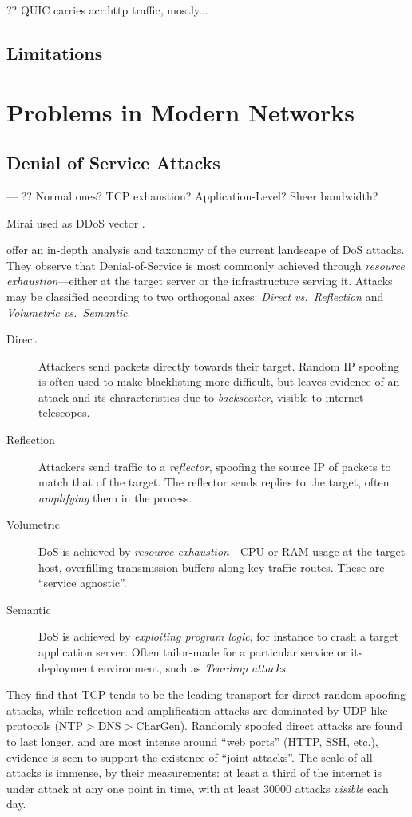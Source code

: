 ?? QUIC carries \gls{acr:http} traffic, mostly...

\subsection{Limitations}

\section{Problems in Modern Networks}\label{sec:problems-in-modern-networks}

\subsection{Denial of Service Attacks}
---
?? Normal ones? TCP exhaustion? Application-Level? Sheer bandwidth?

Mirai used as DDoS vector \cite{DBLP:conf/uss/AntonakakisABBB17}.

\Textcite{DBLP:conf/imc/JonkerKKRSD17} offer an in-depth analysis and taxonomy of the current landscape of DoS attacks.
They observe that Denial-of-Service is most commonly achieved through \emph{resource exhaustion}---either at the target server or the infrastructure serving it.
Attacks may be classified according to two orthogonal axes: \emph{Direct vs.\ Reflection} and \emph{Volumetric vs.\ Semantic}.
\begin{description}
	\item[Direct] Attackers send packets directly towards their target. Random IP spoofing is often used to make blacklisting more difficult, but leaves evidence of an attack and its characteristics due to \emph{backscatter}, visible to internet telescopes.
	\item[Reflection] Attackers send traffic to a \emph{reflector}, spoofing the source IP of packets to match that of the target. The reflector sends replies to the target, often \emph{amplifying} them in the process.
	\item[Volumetric] DoS is achieved by \emph{resource exhaustion}---CPU or RAM usage at the target host, overfilling transmission buffers along key traffic routes. These are ``service agnostic''.
	\item[Semantic] DoS is achieved by \emph{exploiting program logic}, for instance to crash a target application server. Often tailor-made for a particular service or its deployment environment, such as \emph{Teardrop attacks}.
\end{description}
They find that TCP tends to be the leading transport for direct random-spoofing attacks, while reflection and amplification attacks are dominated by UDP-like protocols (NTP$>$DNS$>$CharGen).
Randomly spoofed direct attacks are found to last longer, and are most intense around ``web ports'' (HTTP, SSH, etc.), evidence is seen to support the existence of ``joint attacks''.
The scale of all attacks is immense, by their measurements: at least a third of the internet is under attack at any one point in time, with at least \num{30000} attacks \emph{visible} each day.

